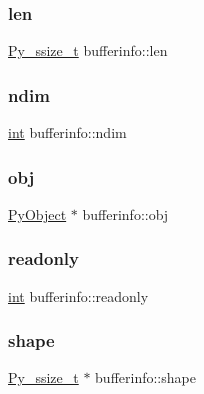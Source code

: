 \subsubsection{\texorpdfstring{len}{len}}
{\footnotesize\ttfamily \mbox{\hyperlink{pyport_8h_ac6411a3dfda9ac6feb9e8d859b1184bc}{Py\+\_\+ssize\+\_\+t}} bufferinfo\+::len}

\mbox{\label{structbufferinfo_a6286d6ec73743f70b1025554fba51724}} 
\subsubsection{\texorpdfstring{ndim}{ndim}}
{\footnotesize\ttfamily \mbox{\hyperlink{warnings_8h_a74f207b5aa4ba51c3a2ad59b219a423b}{int}} bufferinfo\+::ndim}

\mbox{\label{structbufferinfo_a7517716353309d268e23660dc802c6ca}} 
\subsubsection{\texorpdfstring{obj}{obj}}
{\footnotesize\ttfamily \mbox{\hyperlink{_python27_2object_8h_aadc84ac7aed2cfa6f20c25f62bf3dac7}{Py\+Object}} $\ast$ bufferinfo\+::obj}

\mbox{\label{structbufferinfo_ac642ba143cd5883184a5000fde3c0273}} 
\subsubsection{\texorpdfstring{readonly}{readonly}}
{\footnotesize\ttfamily \mbox{\hyperlink{warnings_8h_a74f207b5aa4ba51c3a2ad59b219a423b}{int}} bufferinfo\+::readonly}

\mbox{\label{structbufferinfo_a46c28153bfcc469481d0607733400d6d}} 
\subsubsection{\texorpdfstring{shape}{shape}}
{\footnotesize\ttfamily \mbox{\hyperlink{pyport_8h_ac6411a3dfda9ac6feb9e8d859b1184bc}{Py\+\_\+ssize\+\_\+t}} $\ast$ bufferinfo\+::shape}

